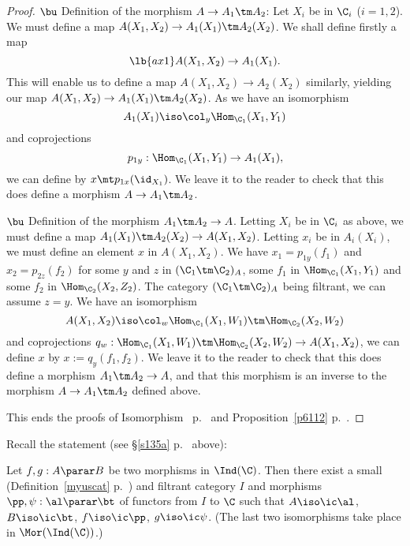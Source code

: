 \documentclass[12pt]{article}
\theoremstyle{remark}
\theoremstyle{definition}
\begin{document}
\begin{proof}
\nn$\bu$ Definition of the morphism $A\to A_1\tm A_2$: Let $X_i$ be in $\C_i$ ($i=1,2$). We must define a map $A(X_1,X_2)\to A_1(X_1)\tm A_2(X_2)$. We shall define firstly a map 
\begin{equation}\lb{ax1}
A(X_1,X_2)\to A_1(X_1). 
\end{equation}  
This will enable us to define a map $A(X_1,X_2)\to A_2(X_2)$ similarly, yielding our map $A(X_1,X_2)\to A_1(X_1)\tm A_2(X_2)$. As we have an isomorphism 
$$
A_1(X_1)\iso\col_y\Hom_{\C_1}(X_1,Y_1)
$$ 
and coprojections 
$$
p_{1y}:\Hom_{\C_1}(X_1,Y_1)\to A_1(X_1),
$$ 
we can define  by $x\mt p_{1x}(\id_{X_1})$. We leave it to the reader to check that this does define a morphism $A\to A_1\tm A_2$.

\nn$\bu$ Definition of the morphism $A_1\tm A_2\to A$. Letting $X_i$ be in $\C_i$ as above, we must define a map $A_1(X_1)\tm A_2(X_2)\to A(X_1,X_2)$. Letting $x_i$ be in $A_i(X_i)$, we must define an element $x$ in $A(X_1,X_2)$. We have $x_1=p_{1y}(f_1)$ and $x_2=p_{2z}(f_2)$ for some $y$ and $z$ in $(\C_1\tm\C_2)_A$, some $f_1$ in $\Hom_{\C_1}(X_1,Y_1)$ and some $f_2$ in $\Hom_{\C_2}(X_2,Z_2)$. The category $(\C_1\tm\C_2)_A$ being filtrant, we can assume $z=y$. We have an isomorphism 
$$
A(X_1,X_2)\iso\col_w\Hom_{\C_1}(X_1,W_1)\tm\Hom_{\C_2}(X_2,W_2)
$$ 
and coprojections $q_w:\Hom_{\C_1}(X_1,W_1)\tm\Hom_{\C_2}(X_2,W_2)\to A(X_1,X_2)$, we can define $x$ by $x:=q_y(f_1,f_2)$. We leave it to the reader to check that this does define a morphism $A_1\tm A_2\to A$, and that this morphism is an inverse to the morphism $A\to A_1\tm A_2$ defined above.

This ends the proofs of Isomorphism~ p.~ and Proposition~\ref{p6112} p.~. 
\end{proof} 



Recall the statement (see \S\ref{s135a} p.~ above):

\begin{cor}[Corollary 6.1.15 p.~135]
Let $f,g:A\parar B$ be two morphisms in $\Ind(\C)$. Then there exist a small (Definition~\ref{myuscat} p.~) and filtrant category $I$ and morphisms $\pp,\psi:\al\parar\bt$ of functors from $I$ to $\C$ such that $A\iso\ic\al$, $B\iso\ic\bt$, $f\iso\ic\pp$, $g\iso\ic\psi$. (The last two isomorphisms take place in $\Mor(\Ind(\C))$.)
\end{cor}
\end{document}
